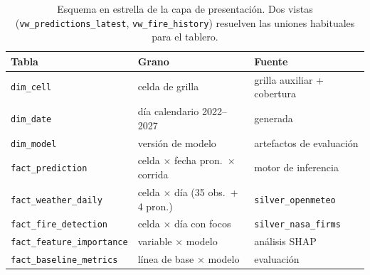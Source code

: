 \documentclass[11pt,a4paper]{article}
\begin{document}
\begin{table}[H]
\centering\small
\begin{tabular}{@{}lll@{}}
\toprule
\textbf{Tabla} & \textbf{Grano} & \textbf{Fuente} \\
\midrule
\texttt{dim\_cell} & celda de grilla & grilla auxiliar + cobertura \\
\texttt{dim\_date} & día calendario 2022--2027 & generada \\
\texttt{dim\_model} & versión de modelo & artefactos de evaluación \\
\texttt{fact\_prediction} & celda $\times$ fecha pron.\ $\times$ corrida & motor de inferencia \\
\texttt{fact\_weather\_daily} & celda $\times$ día (35 obs.\ + 4 pron.) & \texttt{silver\_openmeteo} \\
\texttt{fact\_fire\_detection} & celda $\times$ día con focos & \texttt{silver\_nasa\_firms} \\
\texttt{fact\_feature\_importance} & variable $\times$ modelo & análisis SHAP \\
\texttt{fact\_baseline\_metrics} & línea de base $\times$ modelo & evaluación \\
\bottomrule
\end{tabular}
\caption{Esquema en estrella de la capa de presentación. Dos vistas
(\texttt{vw\_predictions\_latest}, \texttt{vw\_fire\_history}) resuelven las
uniones habituales para el tablero.}
\label{tab:estrella}
\end{table}
\end{document}
